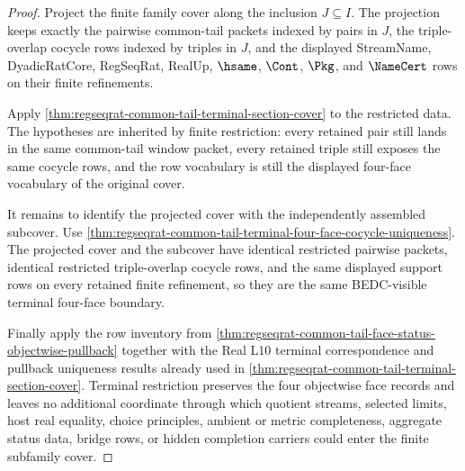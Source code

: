 \begin{proof}
Project the finite family cover along the inclusion $J \subseteq I$. The projection keeps exactly the pairwise common-tail packets indexed by pairs in $J$, the triple-overlap cocycle rows indexed by triples in $J$, and the displayed StreamName, DyadicRatCore, RegSeqRat, RealUp, $\hsame$, $\Cont$, $\Pkg$, and $\NameCert$ rows on their finite refinements.

Apply \autoref{thm:regseqrat-common-tail-terminal-section-cover} to the restricted data. The hypotheses are inherited by finite restriction: every retained pair still lands in the same common-tail window packet, every retained triple still exposes the same cocycle rows, and the row vocabulary is still the displayed four-face vocabulary of the original cover.

It remains to identify the projected cover with the independently assembled subcover. Use \autoref{thm:regseqrat-common-tail-terminal-four-face-cocycle-uniqueness}. The projected cover and the subcover have identical restricted pairwise packets, identical restricted triple-overlap cocycle rows, and the same displayed support rows on every retained finite refinement, so they are the same BEDC-visible terminal four-face boundary.

Finally apply the row inventory from \autoref{thm:regseqrat-common-tail-face-status-objectwise-pullback} together with the Real L10 terminal correspondence and pullback uniqueness results already used in \autoref{thm:regseqrat-common-tail-terminal-section-cover}. Terminal restriction preserves the four objectwise face records and leaves no additional coordinate through which quotient streams, selected limits, host real equality, choice principles, ambient or metric completeness, aggregate status data, bridge rows, or hidden completion carriers could enter the finite subfamily cover.
\end{proof}

